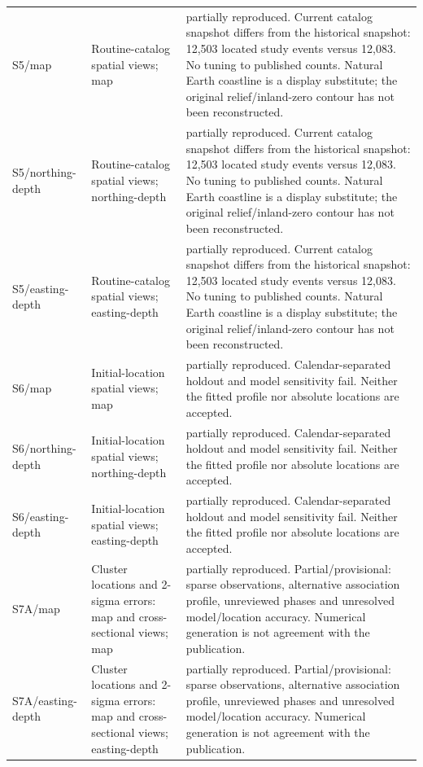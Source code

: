 \begin{longtable}{>{\raggedright\arraybackslash}p{.13\linewidth}>{\raggedright\arraybackslash}p{.28\linewidth}>{\raggedright\arraybackslash}p{.49\linewidth}}
S5/\allowbreak{}map & Routine-catalog spatial views; map & partially reproduced. Current catalog snapshot differs from the historical snapshot: 12,503 located study events versus 12,083. No tuning to published counts. Natural Earth coastline is a display substitute; the original relief/inland-zero contour has not been reconstructed.\\[3pt]
S5/\allowbreak{}northing-depth & Routine-catalog spatial views; northing-depth & partially reproduced. Current catalog snapshot differs from the historical snapshot: 12,503 located study events versus 12,083. No tuning to published counts. Natural Earth coastline is a display substitute; the original relief/inland-zero contour has not been reconstructed.\\[3pt]
S5/\allowbreak{}easting-depth & Routine-catalog spatial views; easting-depth & partially reproduced. Current catalog snapshot differs from the historical snapshot: 12,503 located study events versus 12,083. No tuning to published counts. Natural Earth coastline is a display substitute; the original relief/inland-zero contour has not been reconstructed.\\[3pt]
S6/\allowbreak{}map & Initial-location spatial views; map & partially reproduced. Calendar-separated holdout and model sensitivity fail. Neither the fitted profile nor absolute locations are accepted.\\[3pt]
S6/\allowbreak{}northing-depth & Initial-location spatial views; northing-depth & partially reproduced. Calendar-separated holdout and model sensitivity fail. Neither the fitted profile nor absolute locations are accepted.\\[3pt]
S6/\allowbreak{}easting-depth & Initial-location spatial views; easting-depth & partially reproduced. Calendar-separated holdout and model sensitivity fail. Neither the fitted profile nor absolute locations are accepted.\\[3pt]
S7A/\allowbreak{}map & Cluster locations and 2-sigma errors: map and cross-sectional views; map & partially reproduced. Partial/provisional: sparse observations, alternative association profile, unreviewed phases and unresolved model/location accuracy. Numerical generation is not agreement with the publication.\\[3pt]
S7A/\allowbreak{}easting-depth & Cluster locations and 2-sigma errors: map and cross-sectional views; easting-depth & partially reproduced. Partial/provisional: sparse observations, alternative association profile, unreviewed phases and unresolved model/location accuracy. Numerical generation is not agreement with the publication.\\[3pt]

\end{longtable}
